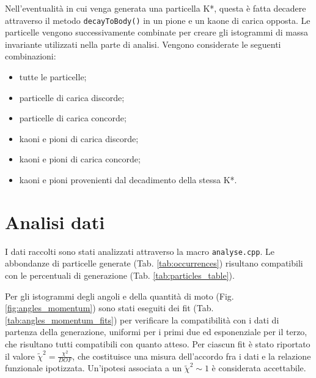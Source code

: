\documentclass{article}
\begin{document}
 \noindent Nell'eventualità in cui venga generata una particella K*, questa è fatta decadere attraverso il metodo \verb|decayToBody()| in un pione e un kaone di carica opposta.
 Le particelle vengono successivamente combinate per creare gli istogrammi di massa invariante utilizzati nella parte di analisi. Vengono considerate le seguenti combinazioni:
\begin{itemize}
    \item tutte le particelle;
    \item particelle di carica discorde;
    \item particelle di carica concorde;
    \item kaoni e pioni di carica discorde;
    \item kaoni e pioni di carica concorde;
    \item kaoni e pioni provenienti dal decadimento della stessa K*.
\end{itemize}

\section{Analisi dati}
I dati raccolti sono stati analizzati attraverso la macro \verb|analyse.cpp|. Le abbondanze di particelle generate (Tab. \ref{tab:occurrences}) risultano compatibili con le percentuali di generazione (Tab. \ref{tab:particles_table}).

Per gli istogrammi degli angoli e della quantità di moto (Fig. \ref{fig:angles_momentum}) sono stati eseguiti dei fit (Tab. \ref{tab:angles_momentum_fits}) per verificare la compatibilità con i dati di partenza della generazione, uniformi per i primi due ed esponenziale per il terzo, che risultano tutti compatibili con quanto atteso. Per ciascun fit è stato riportato il valore $\widetilde{\chi}^2 = \frac{\chi^2}{DOF}$, che costituisce una misura dell'accordo fra i dati e la relazione funzionale ipotizzata. Un'ipotesi associata a un $\widetilde{\chi}^2 \sim 1$ è considerata accettabile.
\end{document}
